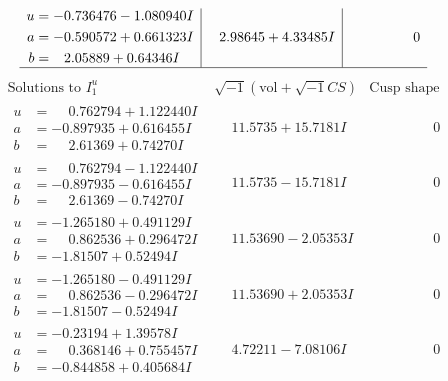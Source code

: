 \documentclass[1p]{elsarticle_modified}
\theoremstyle{definition}
\newcommand{\I}{\sqrt{-1}}
\begin{document}
$$\begin{array}{c|c|c}
\begin{aligned}
u &= -0.736476 - 1.080940 I \\
a &= -0.590572 + 0.661323 I \\
b &= \phantom{-}2.05889 + 0.64346 I\end{aligned}
 & \phantom{-}2.98645 + 4.33485 I & \phantom{-0.000000 } 0\\
 \hline 
 \end{array}$$\newpage$$\begin{array}{c|c|c}  
\text{Solutions to }I^u_{1}& \I (\text{vol} + \sqrt{-1}CS) & \text{Cusp shape}\\
 \hline 
\begin{aligned}
u &= \phantom{-}0.762794 + 1.122440 I \\
a &= -0.897935 + 0.616455 I \\
b &= \phantom{-}2.61369 + 0.74270 I\end{aligned}
 & \phantom{-}11.5735 + 15.7181 I & \phantom{-0.000000 } 0 \\ \hline\begin{aligned}
u &= \phantom{-}0.762794 - 1.122440 I \\
a &= -0.897935 - 0.616455 I \\
b &= \phantom{-}2.61369 - 0.74270 I\end{aligned}
 & \phantom{-}11.5735 - 15.7181 I & \phantom{-0.000000 } 0 \\ \hline\begin{aligned}
u &= -1.265180 + 0.491129 I \\
a &= \phantom{-}0.862536 + 0.296472 I \\
b &= -1.81507 + 0.52494 I\end{aligned}
 & \phantom{-}11.53690 - 2.05353 I & \phantom{-0.000000 } 0 \\ \hline\begin{aligned}
u &= -1.265180 - 0.491129 I \\
a &= \phantom{-}0.862536 - 0.296472 I \\
b &= -1.81507 - 0.52494 I\end{aligned}
 & \phantom{-}11.53690 + 2.05353 I & \phantom{-0.000000 } 0 \\ \hline\begin{aligned}
u &= -0.23194 + 1.39578 I \\
a &= \phantom{-}0.368146 + 0.755457 I \\
b &= -0.844858 + 0.405684 I\end{aligned}
 & \phantom{-}4.72211 - 7.08106 I & \phantom{-0.000000 } 0 \\ \hline\begin{aligned}

\end{aligned}
\end{array}$$
\end{document}
